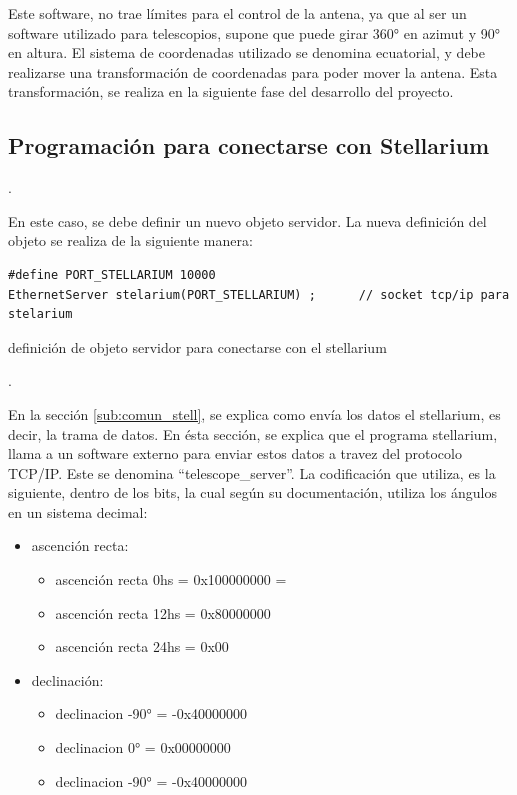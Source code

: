 Este software, no trae límites para el control de la antena, ya que al ser un software utilizado para telescopios, supone que puede girar 360° en azimut y 90° en altura. El sistema de coordenadas utilizado se denomina ecuatorial, y debe realizarse una transformación de coordenadas para poder mover la antena. Esta transformación, se realiza en la siguiente fase del desarrollo del proyecto. 



\subsection{Programación para conectarse con Stellarium}. 

En este caso, se debe definir un nuevo objeto servidor. La nueva definición del objeto se realiza de la siguiente manera: 

\begin{listing}[ht]
	\begin{verbatim}
#define PORT_STELLARIUM 10000
EthernetServer stelarium(PORT_STELLARIUM) ;      // socket tcp/ip para stelarium 
	\end{verbatim}
\caption{definición de objeto servidor para conectarse con el stellarium}. 
\end{listing}

En la sección \ref{sub:comun_stell}, se explica como envía los datos el stellarium, es decir, la trama de datos. En ésta sección, se explica que el programa stellarium, llama a un software externo para enviar estos datos a travez del protocolo TCP/IP. Este se denomina ``telescope\_server''. La codificación que utiliza, es la siguiente, dentro de los bits, la cual según su documentación, utiliza los ángulos en un sistema decimal: 

\begin{itemize}
	\item ascención recta: 
		\begin{itemize}
		 \item	ascención recta 0hs  = 0x100000000 = 		
		 \item	ascención recta 12hs = 0x80000000 
		 \item	ascención recta 24hs = 0x00	
	\end{itemize}
	\item declinación: 
		\begin{itemize}
		  \item	declinacion -90° = -0x40000000
		  \item	declinacion  0°  =  0x00000000
		  \item	declinacion -90° = -0x40000000
		\end{itemize}
\end{itemize}

